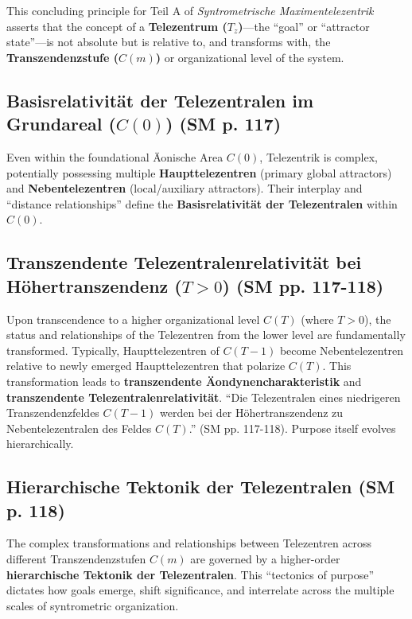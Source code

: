 \documentclass[
    12pt,              %
    a4paper,           %
    headings=normal,   %
    twoside=true,      %
    BCOR=8mm,          %
]{scrbook}
\newcommand{\q}[1]{\enquote{#1}}
\newcommand{\telezentrum}{T_z}
\newcommand{\transzendenzstufe}[1]{C(#1)}
\begin{document}
This concluding principle for Teil A of \textit{Syntrometrische Maximentelezentrik} asserts that the concept of a \textbf{Telezentrum (\(\telezentrum\))}—the \q{goal} or \q{attractor state}—is not absolute but is relative to, and transforms with, the \textbf{Transzendenzstufe (\(\transzendenzstufe{m}\))} or organizational level of the system.

\subsection{Basisrelativität der Telezentralen im Grundareal (\(\transzendenzstufe{0}\)) (SM p. 117)}
\label{sec:ch6_basisrelativitaet_telezentralen}
Even within the foundational Äonische Area \(\transzendenzstufe{0}\), Telezentrik is complex, potentially possessing multiple \textbf{Haupttelezentren} (primary global attractors) and \textbf{Nebentelezentren} (local/auxiliary attractors). Their interplay and \q{distance relationships} define the \textbf{Basisrelativität der Telezentralen} within \(\transzendenzstufe{0}\).

\subsection{Transzendente Telezentralenrelativität bei Höhertranszendenz (\( T > 0 \)) (SM pp. 117-118)}
\label{sec:ch6_transzendente_relativitaet_telezentralen}
Upon transcendence to a higher organizational level \(\transzendenzstufe{T}\) (where \( T > 0 \)), the status and relationships of the Telezentren from the lower level are fundamentally transformed. Typically, Haupttelezentren of \(\transzendenzstufe{T-1}\) become Nebentelezentren relative to newly emerged Haupttelezentren that polarize \(\transzendenzstufe{T}\). This transformation leads to \textbf{transzendente Äondynencharakteristik} and \textbf{transzendente Telezentralenrelativität}. \q{Die Telezentralen eines niedrigeren Transzendenzfeldes \( C(T-1) \) werden bei der Höhertranszendenz zu Nebentelezentralen des Feldes \( C(T) \).} (SM pp. 117-118). Purpose itself evolves hierarchically.

\subsection{Hierarchische Tektonik der Telezentralen (SM p. 118)}
\label{sec:ch6_hierarchische_tektonik_telezentralen}
The complex transformations and relationships between Telezentren across different Transzendenzstufen \(\transzendenzstufe{m}\) are governed by a higher-order \textbf{hierarchische Tektonik der Telezentralen}. This \q{tectonics of purpose} dictates how goals emerge, shift significance, and interrelate across the multiple scales of syntrometric organization.
\end{document}
